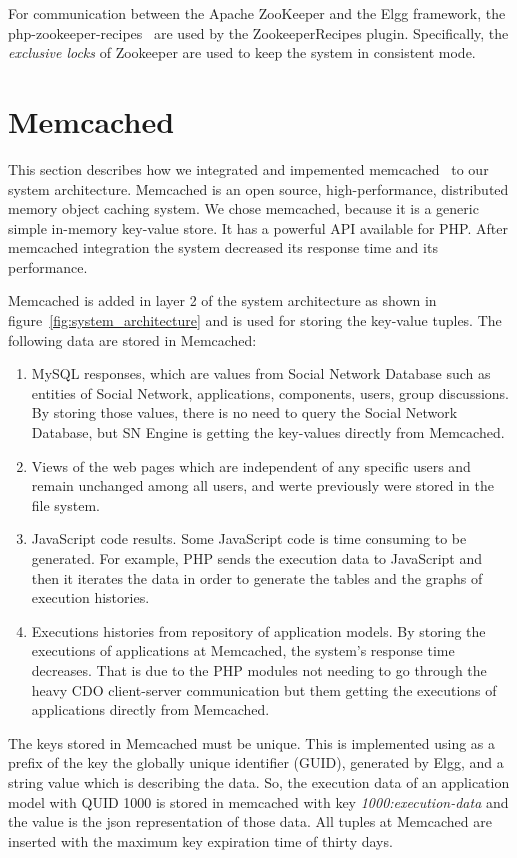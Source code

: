 For communication between the Apache ZooKeeper and the Elgg framework, the php-zookeeper-recipes~\cite{zookeeper_recipes_url} are used by the ZookeeperRecipes plugin. Specifically, the {\it exclusive locks} of Zookeeper are used to keep the system in consistent mode.

\section{Memcached}
\label{sec:memcache_implementation}
This section describes how we integrated and impemented memcached~\cite{memcache_url} to our system architecture. Memcached is an open source, high-performance, distributed memory object caching system. We chose memcached, because it is a generic simple in-memory key-value store. It has a powerful API available for PHP. After memcached integration the system decreased its response time and its performance.

Memcached is added in layer 2 of the system architecture as shown in figure~\ref{fig:system_architecture} and is used for storing the key-value tuples. The following data are stored in Memcached: 
\begin{enumerate}
\item MySQL responses, which are values from Social Network Database such as entities of Social Network, applications, components, users, group discussions. By storing those values, there is no need to query the Social Network Database, but SN Engine is getting the key-values directly from Memcached.
\item Views of the web pages which are independent of any specific users and remain unchanged among all users, and werte previously were stored in the file system.
\item JavaScript code results. Some JavaScript code is time consuming to be generated. For example, PHP sends the execution data to JavaScript and then it iterates the data in order to generate the tables and the graphs of execution histories.
\item Executions histories from repository of application models. By storing the executions of applications at Memcached, the system's response time decreases. That is due to the PHP modules not needing to go through the heavy CDO client-server communication but them getting the executions of applications directly from Memcached.
\end{enumerate}

The keys stored in Memcached must be unique. This is implemented using as a prefix of the key the globally unique identifier (GUID), generated by Elgg, and a string value which is describing the data. So, the execution data of an application model with QUID 1000 is stored in memcached with key {\it 1000:execution-data} and the value is the json representation of those data. All tuples at Memcached are inserted with the maximum key expiration time of thirty days.

